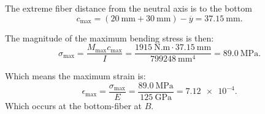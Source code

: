 \begin{derivation}
  The extreme fiber distance from the neutral axis is to the bottom
  \begin{equation*}
    c_{\mathrm{max}} = \left( \qty{20}{\mm} + \qty{30}{\mm}  \right)- \overline{y} = \qty{37.15}{\mm} 
  .\end{equation*}
  
  The magnitude of the maximum bending stress is then:
  \begin{equation*}
    \sigma_{\mathrm{max}} = \frac{M_{\mathrm{max}} c_{\mathrm{max}}}{I} = \frac{\qty{1915}{\N.\m} \cdot \qty{37.15}{\mm} }{\qty{799248}{\mm^{4}} } = \qty{89,0}{\MPa} 
  .\end{equation*}
  
  Which means the maximum strain is:
  \begin{equation*}
    \epsilon_{\mathrm{max}} = \frac{\sigma_{\mathrm{max}}}{E} = \frac{\qty{89,0}{\MPa}}{\qty{125}{\GPa} } = \num{7,12e-4} 
  .\end{equation*}
  Which occurs at the bottom-fiber at $B$.
\end{derivation}

